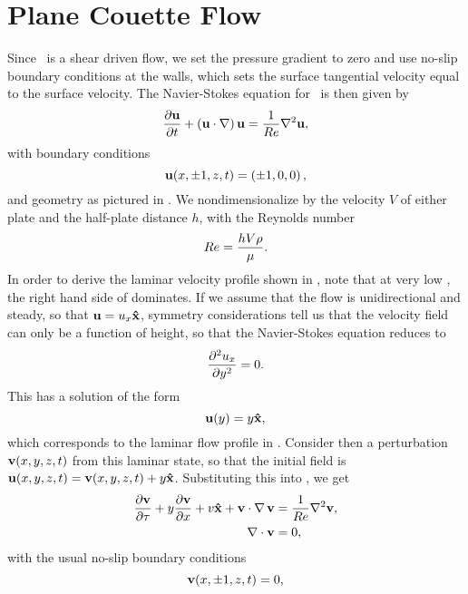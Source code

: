 \section{Plane Couette Flow}
Since \pCf\ is a shear driven flow, we set the pressure gradient to zero and use no-slip boundary conditions at the walls, which sets the surface tangential velocity equal to the surface velocity. The Navier-Stokes equation for \pCf\ is then given by 
\begin{equation}\label{eq:NSPCF}
\pder{1}{\Vector{u}}{t} + \paren{\Vector{u}\cdot\nabla}\Vector{u} = \frac{1}{\ReN}\nabla^2\Vector{u},
\end{equation}
with boundary conditions 
\begin{equation}
\mathbf{u}(x,\pm1,z,t) = \left ( \pm1,0,0 \right ),
\end{equation}
and geometry as pictured in . We nondimensionalize by the velocity $V$ of either plate and the half-plate distance $h$, with the Reynolds number
\begin{equation}
Re = \dfrac{hV\rho}{\mu}.
\end{equation} In order to derive the laminar velocity profile shown in , note that at very low \ReN, the right hand side of  dominates. If we assume that the flow is unidirectional and steady, so that $\mathbf{u} = u_x \mathbf{\hat{x}}$, symmetry considerations tell us that the velocity field can only be a function of height, so that the Navier-Stokes equation reduces to 
\begin{equation}
\pder{2}{u_x}{y} = 0.
\end{equation}
This has a solution of the form
\begin{equation}
\mathbf{u}(y) = y\mathbf{\hat{x}},
\end{equation}
which corresponds to the laminar flow profile in . Consider then a perturbation $\mathbf{v}(x,y,z,t)$ from this laminar state, so that the initial field is $\mathbf{u}(x,y,z,t) = \mathbf{v} (x,y,z,t)+ y\mathbf{\hat{x}}$. Substituting this into , we get 
\begin{align}
\pder{1}{\Vector{v}}{\tau} + y\pder{1}{\Vector{v}}{x} + v\Vector{\hat{x}} + \Vector{v}\cdot\Grad{\Vector{v}} &= \frac{1}{\ReN} \nabla^2\Vector{v},\label{eq:PertND}\\
\Div{\Vector{v}} &= 0,
\end{align}
with the usual no-slip boundary conditions 
\begin{equation}
\mathbf{v}(x,\pm 1,z,t) = 0,
\end{equation}

